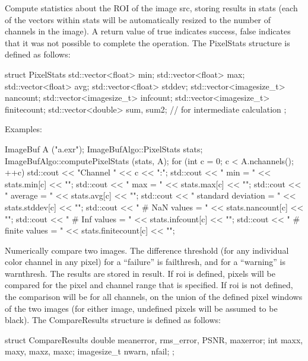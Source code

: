 Compute statistics about the ROI of the image {\cf src}, storing results
in {\cf stats} (each of the vectors within {\cf stats} will be
automatically resized to the number of channels in the image).  A return
value of {\cf true} indicates success, {\cf false} indicates that it was
not possible to complete the operation.
 The {\cf PixelStats} structure is defined as follows:
\begin{code}
struct PixelStats {
    std::vector<float> min;
    std::vector<float> max;
    std::vector<float> avg;
    std::vector<float> stddev;
    std::vector<imagesize_t> nancount;
    std::vector<imagesize_t> infcount;
    std::vector<imagesize_t> finitecount;
    std::vector<double> sum, sum2;  // for intermediate calculation
};
\end{code}

\smallskip
\noindent Examples:
\begin{code}
    ImageBuf A ("a.exr");
    ImageBufAlgo::PixelStats stats;
    ImageBufAlgo::computePixelStats (stats, A);
    for (int c = 0;  c < A.nchannels();  ++c) {
        std::cout << "Channel " << c << ":\n";
        std::cout << "   min = " << stats.min[c] << "\n";
        std::cout << "   max = " << stats.max[c] << "\n";
        std::cout << "   average = " << stats.avg[c] << "\n";
        std::cout << "   standard deviation  = " << stats.stddev[c] << "\n";
        std::cout << "   # NaN values    = " << stats.nancount[c] << "\n";
        std::cout << "   # Inf values    = " << stats.infcount[c] << "\n";
        std::cout << "   # finite values = " << stats.finitecount[c] << "\n";
    }
\end{code}
\apiend

 

Numerically compare two images.  The difference threshold (for any
individual color channel in any pixel) for a ``failure'' is
{\cf failthresh}, and for a ``warning'' is {\cf warnthresh}.  The 
results are stored in {\cf result}.  If {\cf roi} is defined, pixels
will be compared for the pixel and channel range that is specified.  If
{\cf roi} is not defined, the comparison will be for all channels, on
the union of the defined pixel windows of the two images (for either
image, undefined pixels will be assumed to be black).  The 
{\cf CompareResults} structure is defined as follows:
\begin{code}
struct CompareResults {
    double meanerror, rms_error, PSNR, maxerror;
    int maxx, maxy, maxz, maxc;
    imagesize_t nwarn, nfail;
};
\end{code}

